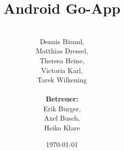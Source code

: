 \documentclass[parskip=full]{scrartcl}
\begin{document}
\title{Android Go-App}
\author{\\Dennis Bäuml,\\ Matthias Dressel,\\ Theresa Heine,\\ Victoria Karl, \\ Tarek Wilkening\\
	\\ \textbf{Betreuer:} \\
		Erik Burger, \\
		Axel Busch, \\
		Heiko Klare \\
				}
\date{\today}
\maketitle
\newpage
\tableofcontents
\newpage


\newpage

\newpage

\newpage

\newpage

\newpage

\newpage

\newpage

\newpage

\newpage

\newpage

\newpage

\newpage

\end{document}
